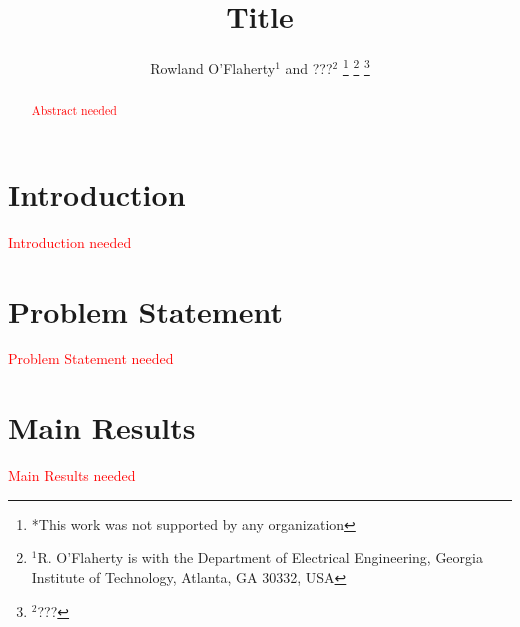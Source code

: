 \documentclass[letterpaper, 10 pt, conference]{ieeeconf}
\providecommand{\note}{\textcolor{red}} %
\begin{document}


\pagestyle{plain}

\title{\LARGE \bf
	Title
}

\author{Rowland O'Flaherty$^{1}$ and ???$^{2}$%
\thanks{*This work was not supported by any organization}%
\thanks{$^{1}$R. O'Flaherty is with the Department of Electrical Engineering, Georgia Institute of Technology, Atlanta, GA 30332, USA}%
\thanks{$^{2}$???}%
}

\maketitle
\thispagestyle{empty}
\pagestyle{empty}

\begin{abstract}
\note{Abstract needed}
\end{abstract}

\section{Introduction} \label{sec:introduction}
\note{Introduction needed}

\section{Problem Statement} \label{sec:problemStatement}
\note{Problem Statement needed}

\section{Main Results} \label{sec:mainResults}
\note{Main Results needed} 
\end{document}
